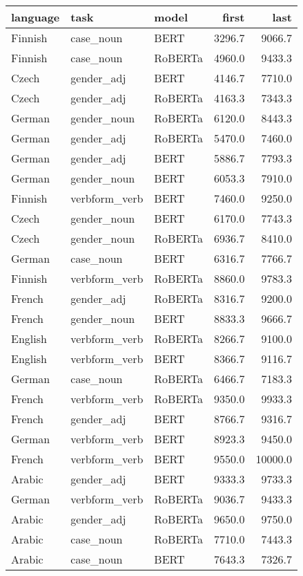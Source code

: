 \begin{tabular}{lllrr}
\toprule
language &           task &    model &   first &     last \\
\midrule
 Finnish &      case\_noun &     BERT &  3296.7 &   9066.7 \\
 Finnish &      case\_noun &  RoBERTa &  4960.0 &   9433.3 \\
   Czech &     gender\_adj &     BERT &  4146.7 &   7710.0 \\
   Czech &     gender\_adj &  RoBERTa &  4163.3 &   7343.3 \\
  German &    gender\_noun &  RoBERTa &  6120.0 &   8443.3 \\
  German &     gender\_adj &  RoBERTa &  5470.0 &   7460.0 \\
  German &     gender\_adj &     BERT &  5886.7 &   7793.3 \\
  German &    gender\_noun &     BERT &  6053.3 &   7910.0 \\
 Finnish &  verbform\_verb &     BERT &  7460.0 &   9250.0 \\
   Czech &    gender\_noun &     BERT &  6170.0 &   7743.3 \\
   Czech &    gender\_noun &  RoBERTa &  6936.7 &   8410.0 \\
  German &      case\_noun &     BERT &  6316.7 &   7766.7 \\
 Finnish &  verbform\_verb &  RoBERTa &  8860.0 &   9783.3 \\
  French &     gender\_adj &  RoBERTa &  8316.7 &   9200.0 \\
  French &    gender\_noun &     BERT &  8833.3 &   9666.7 \\
 English &  verbform\_verb &  RoBERTa &  8266.7 &   9100.0 \\
 English &  verbform\_verb &     BERT &  8366.7 &   9116.7 \\
  German &      case\_noun &  RoBERTa &  6466.7 &   7183.3 \\
  French &  verbform\_verb &  RoBERTa &  9350.0 &   9933.3 \\
  French &     gender\_adj &     BERT &  8766.7 &   9316.7 \\
  German &  verbform\_verb &     BERT &  8923.3 &   9450.0 \\
  French &  verbform\_verb &     BERT &  9550.0 &  10000.0 \\
  Arabic &     gender\_adj &     BERT &  9333.3 &   9733.3 \\
  German &  verbform\_verb &  RoBERTa &  9036.7 &   9433.3 \\
  Arabic &     gender\_adj &  RoBERTa &  9650.0 &   9750.0 \\
  Arabic &      case\_noun &  RoBERTa &  7710.0 &   7443.3 \\
  Arabic &      case\_noun &     BERT &  7643.3 &   7326.7 \\
\bottomrule
\end{tabular}
